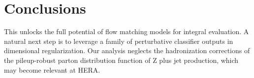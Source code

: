 \section{Conclusions}\label{sec:conclusions}

This unlocks the full potential of flow matching models for integral
evaluation. A natural next step is to leverage a family of perturbative
classifier outputs in dimensional regularization. Our analysis neglects
the hadronization corrections of the pileup-robust parton distribution
function of Z plus jet production, which may become relevant at HERA.

